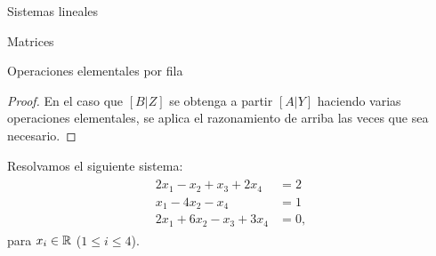 \begin{chapter}{Sistemas lineales}
\begin{section}{Matrices}
\begin{subsection}{Operaciones elementales por fila}
\begin{proof}
                 En el caso que $[B | Z]$ se obtenga a partir $[A | Y]$ haciendo varias operaciones elementales,  se aplica el razonamiento de arriba las veces que sea necesario. 
            \end{proof}
                
                \begin{ejemplo*}\label{ejemplo2.11}
                    Resolvamos el siguiente sistema:
                    \begin{align}\label{sist-eq-01}
                    \begin{split}
                    2x_1 - x_2 + x_3 + 2x_4 &= 2 \\
                    x_1 - 4x_2 -x_4 &=1 \\
                    2x_1 +6x_2 -x_3 +3x_4 &= 0,  
                    \end{split}
                    \end{align}
                    para  $x_i \in \mathbb R$ ($1 \le i \le 4$). 
                

\end{ejemplo*}
\end{subsection}
\end{section}
\end{chapter}
